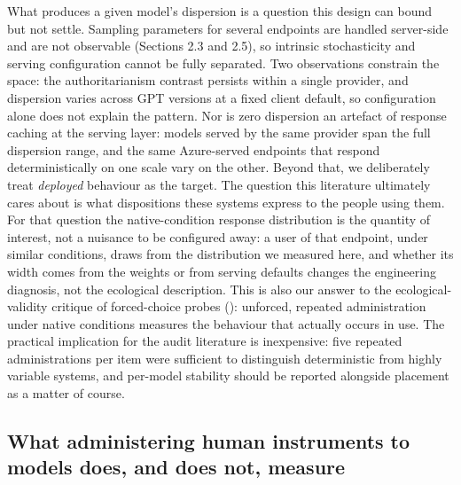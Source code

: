 \documentclass[
]{article}
\begin{document}
What produces a given model's dispersion is a question this design can
bound but not settle. Sampling parameters for several endpoints are
handled server-side and are not observable (Sections 2.3 and 2.5), so
intrinsic stochasticity and serving configuration cannot be fully
separated. Two observations constrain the space: the authoritarianism
contrast persists within a single provider, and dispersion varies across
GPT versions at a fixed client default, so configuration alone does not
explain the pattern. Nor is zero dispersion an artefact of response
caching at the serving layer: models served by the same provider span
the full dispersion range, and the same Azure-served endpoints that
respond deterministically on one scale vary on the other. Beyond that,
we deliberately treat \emph{deployed} behaviour as the target. The
question this literature ultimately cares about is what dispositions
these systems express to the people using them. For that question the
native-condition response distribution is the quantity of interest, not
a nuisance to be configured away: a user of that endpoint, under similar
conditions, draws from the distribution we measured here, and whether
its width comes from the weights or from serving defaults changes the
engineering diagnosis, not the ecological description. This is also our
answer to the ecological-validity critique of forced-choice probes
(): unforced, repeated
administration under native conditions measures the behaviour that
actually occurs in use. The practical implication for the audit
literature is inexpensive: five repeated administrations per item were
sufficient to distinguish deterministic from highly variable systems,
and per-model stability should be reported alongside placement as a
matter of course.

\subsection{What administering human instruments to models does, and
does not,
measure}\label{what-administering-human-instruments-to-models-does-and-does-not-measure}
\end{document}
